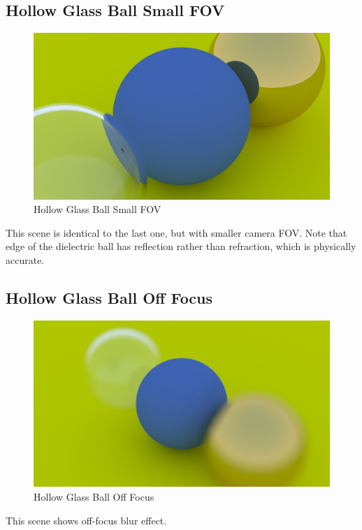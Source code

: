 \documentclass[utf8]{article}
\begin{document}
\subsection{Hollow Glass Ball Small FOV}
\begin{figure}[H]
	\centering
	\includegraphics[width=0.7\linewidth]{../results/hollow_glass_ball_small_fov}
	\caption{Hollow Glass Ball Small FOV}
	\label{fig:hollowglassballsmallfov}
\end{figure}
This scene is identical to the last one, but with smaller camera FOV. Note that edge of the dielectric ball has reflection rather than refraction, which is physically accurate.

\subsection{Hollow Glass Ball Off Focus}
\begin{figure}[H]
	\centering
	\includegraphics[width=0.7\linewidth]{../results/hollow_glass_ball_off_focus}
	\caption{Hollow Glass Ball Off Focus}
	\label{fig:hollowglassballofffocus}
\end{figure}
This scene shows off-focus blur effect.
\end{document}
